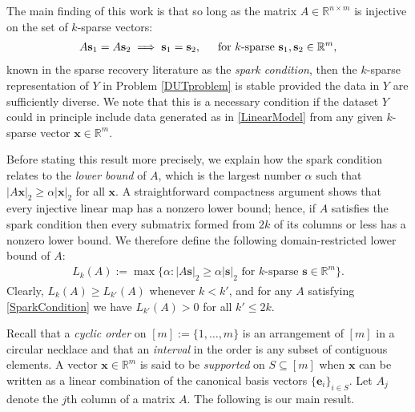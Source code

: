 \documentclass[journal, twocolumn]{IEEEtran}
\begin{document}
The main finding of this work is that so long as the matrix $A \in \mathbb{R}^{n \times m}$ is injective on the set of $k$-sparse vectors: 
\begin{align}\label{SparkCondition}
A\mathbf{s}_1 = A\mathbf{s}_2 \implies \mathbf{s}_1 = \mathbf{s}_2,\indent \text{for $k$-sparse } \mathbf{s}_1, \mathbf{s}_2 \in \mathbb{R}^m,
\end{align}
known in the sparse recovery literature as the \emph{spark condition}, then the $k$-sparse representation of $Y$ in Problem \ref{DUTproblem} is stable provided the data in $Y$ are sufficiently diverse. We note that this is a necessary condition if the dataset $Y$ could in principle include data generated as in \eqref{LinearModel} from any given $k$-sparse vector $\mathbf{x} \in \mathbb{R}^m$. 

Before stating this result more precisely, we explain how the spark condition relates to the \emph{lower bound} \cite{Grcar10} of $A$, which is the largest number $\alpha$ such that $|A\mathbf{x}|_2 \geq \alpha|\mathbf{x}|_2$ for all $\mathbf{x}$. A straightforward compactness argument shows that every injective linear map has a nonzero lower bound; hence, if $A$ satisfies the spark condition then every submatrix formed from $2k$ of its columns or less has a nonzero lower bound. We therefore define the following domain-restricted lower bound of $A$:
\begin{align}
L_k(A) := \max \{ \alpha : |A\mathbf{s}|_2 \geq \alpha|\mathbf{s}|_2 \text{ for $k$-sparse } \mathbf{s} \in \mathbb{R}^m\}.
\end{align} 
Clearly, $L_k(A) \geq L_{k'}(A)$ whenever $k < k'$, and for any $A$ satisfying \eqref{SparkCondition} we have $L_{k'}(A) > 0$ for all $k' \leq 2k$. 

Recall that a \textit{cyclic order} on $[m] := \{1, \ldots,m\}$ is an arrangement of $[m]$ in a circular necklace and that an \textit{interval} in the order is any subset of contiguous elements. A vector $\mathbf{x} \in \mathbb{R}^m$ is said to be \emph{supported} on $S \subseteq [m]$ when $\mathbf{x}$ can be written as a linear combination of the canonical basis vectors $\{\mathbf{e}_i\}_{i \in S}$. Let $A_j$ denote the $j$th column of a matrix $A$. The following is our main result.
\end{document}
